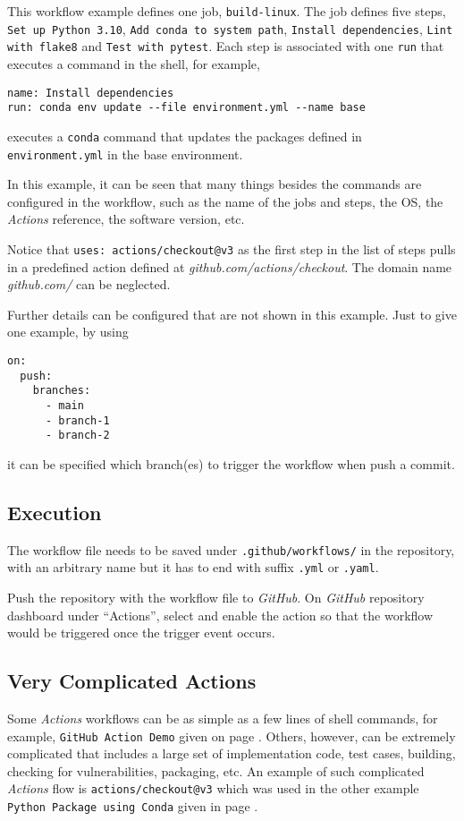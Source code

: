 This workflow example defines one job, \verb|build-linux|. The job defines five steps, \verb|Set up Python 3.10|, \verb|Add conda to system path|, \verb|Install dependencies|, \verb|Lint with flake8| and \verb|Test with pytest|. Each step is associated with one \verb|run| that executes a command in the shell, for example,
\begin{lstlisting}
name: Install dependencies
run: conda env update --file environment.yml --name base
\end{lstlisting}
executes a \verb|conda| command that updates the packages defined in \verb|environment.yml| in the base environment.

In this example, it can be seen that many things besides the commands are configured in the workflow, such as the name of the jobs and steps, the OS, the \textit{Actions} reference, the software version, etc.

Notice that \verb|uses: actions/checkout@v3| as the first step in the list of steps pulls in a predefined action defined at \textit{github.com/actions/checkout}. The domain name \textit{github.com/} can be neglected.

Further details can be configured that are not shown in this example. Just to give one example, by using
\begin{lstlisting}
on:
  push:
    branches:
      - main
      - branch-1
      - branch-2
\end{lstlisting}
it can be specified which branch(es) to trigger the workflow when push a commit.

\subsection{Execution}

The workflow file needs to be saved under \verb|.github/workflows/| in the repository, with an arbitrary name but it has to end with suffix \verb|.yml| or \verb|.yaml|.

Push the repository with the workflow file to \textit{GitHub}. On \textit{GitHub} repository dashboard under ``Actions'', select and enable the action so that the workflow would be triggered once the trigger event occurs.

\subsection{Very Complicated Actions}

Some \textit{Actions} workflows can be as simple as a few lines of shell commands, for example, \verb|GitHub Action Demo| given on page \pageref{code:githubactionsdemo}. Others, however, can be extremely complicated that includes a large set of implementation code, test cases, building, checking for vulnerabilities, packaging, etc. An example of such complicated \textit{Actions} flow is \verb|actions/checkout@v3| which was used in the other example \verb|Python Package using Conda| given in page \pageref{code:pythonpackageusingconda}.

